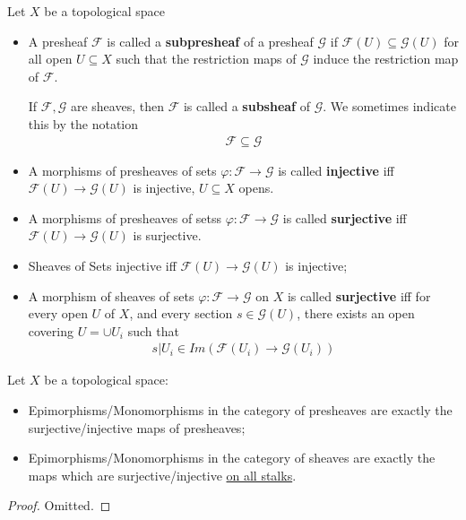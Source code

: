 \documentclass[Total.tex]{subfiles}
\begin{document}
				\begin{Def} Let $X$ be a topological space
					\begin{itemize}
						\item A presheaf $\mathcal{F}$ is called a \textbf{subpresheaf} of a presheaf $\mathcal{G}$ if $\mathcal{F}(U)\subseteq \mathcal{G}(U)$ for all open $U\subseteq X$ such that the restriction maps of $\mathcal{G}$ induce the restriction map of $\mathcal{F}$. 
						
						If $\mathcal{F},\mathcal{G}$ are sheaves, then $\mathcal{F}$ is called a \textbf{subsheaf} of $\mathcal{G}$. We sometimes indicate this by the notation
						\begin{gather*}
							\mathcal{F}\subseteq \mathcal{G}
						\end{gather*}
						\item A morphisms of presheaves of sets $\varphi:\mathcal{F}\rightarrow\mathcal{G}$ is called \textbf{injective} iff $\mathcal{F}(U)\rightarrow \mathcal{G}(U)$ is injective, $U\subseteq X$ opens.
						\item A morphisms of presheaves of setss $\varphi:\mathcal{F}\rightarrow \mathcal{G}$ is called \textbf{surjective} iff $\mathcal{F}(U)\rightarrow \mathcal{G}(U)$ is surjective.
						\item Sheaves of Sets injective iff $\mathcal{F}(U)\rightarrow \mathcal{G}(U)$ is injective;
						\item A morphism of sheaves of sets $\varphi:\mathcal{F}\rightarrow \mathcal{G}$ on $X$ is called \textbf{surjective} iff for every open $U$ of $X$, and every section $s\in \mathcal{G}(U)$, there exists an open covering $U=\cup U_i$ such that
						\begin{gather*}
							s|U_i\in Im(\mathcal{F}(U_i)\rightarrow \mathcal{G}(U_i))
						\end{gather*}
					\end{itemize}
				\end{Def}
				
				\begin{lemma}
					Let $X$ be a topological space:
					\begin{itemize}
						\item Epimorphisms/Monomorphisms in the category of presheaves are exactly the surjective/injective maps of presheaves;
						\item Epimorphisms/Monomorphisms in the category of sheaves are exactly the maps which are surjective/injective \underline{on all stalks}.
					\end{itemize}
				\end{lemma}
				\begin{proof} Omitted.
				\end{proof}
				
\end{document}
